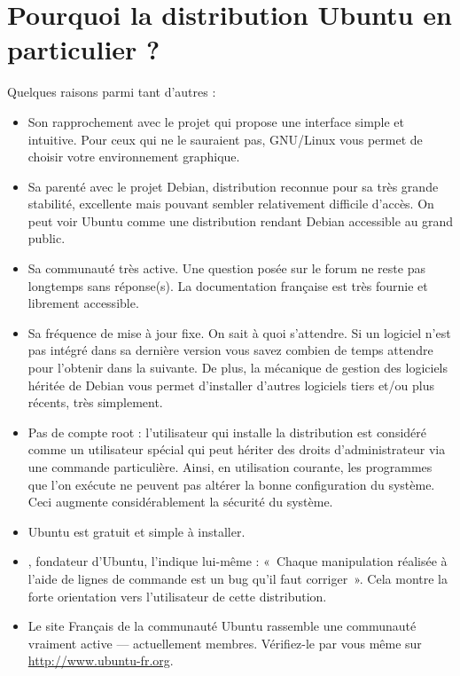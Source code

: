 \section{Pourquoi la distribution Ubuntu en particulier ?}
Quelques raisons parmi tant d'autres :
\begin{itemize}
\item Son rapprochement avec le projet  qui propose une interface simple et intuitive. Pour ceux qui ne le sauraient pas, GNU/Linux vous permet de choisir votre environnement graphique.
\item Sa parenté avec le projet Debian, distribution reconnue pour sa très grande stabilité, excellente mais pouvant sembler relativement difficile d'accès. On peut voir Ubuntu comme une distribution rendant Debian accessible au grand public.
\item Sa communauté très active. Une question posée sur le forum ne reste pas longtemps sans réponse(s). La documentation française est très fournie et librement accessible.
\item Sa fréquence de mise à jour fixe. On sait à quoi s'attendre. Si un logiciel n'est pas intégré dans sa dernière version vous savez combien de temps attendre pour l'obtenir dans la suivante. De plus, la mécanique de gestion des logiciels héritée de Debian vous permet d'installer d'autres logiciels tiers et/ou plus récents, très simplement.
\item Pas de compte root : l'utilisateur qui installe la distribution est considéré comme un utilisateur spécial qui peut hériter des droits d'administrateur via une commande particulière. Ainsi, en utilisation courante, les programmes que l'on exécute ne peuvent pas altérer la bonne configuration du système. Ceci augmente considérablement la sécurité du système.
\item Ubuntu est gratuit et simple à installer.
\item {}, fondateur d'Ubuntu, l'indique lui-même : «~Chaque manipulation réalisée à l'aide de lignes de commande est un bug qu'il faut corriger~». Cela montre la forte orientation vers l'utilisateur de cette distribution.
\item Le site Français de la communauté Ubuntu rassemble une communauté vraiment active --- actuellement \NbMembresUbuntufr{} membres. Vérifiez-le par vous même sur \url{http://www.ubuntu-fr.org}.
\end{itemize}
